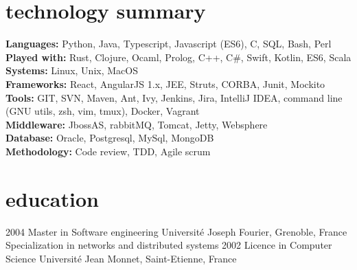 \documentclass[]{k-cv} %
\begin{document}

\section{technology summary}

\begin{freetext}
{
\textbf{Languages:} Python, Java, Typescript, Javascript (ES6), C, SQL, Bash, Perl\\
\textbf{Played with:} Rust, Clojure, Ocaml, Prolog, C++, C\#, Swift, Kotlin, ES6, Scala\\
\textbf{Systems:} Linux, Unix, MacOS\\
\textbf{Frameworks:} React, AngularJS 1.x, JEE, Struts, CORBA, Junit, Mockito\\
\textbf{Tools:} GIT, SVN, Maven, Ant, Ivy, Jenkins, Jira, IntelliJ IDEA, command line (GNU utils, zsh, vim, tmux), Docker, Vagrant\\
\textbf{Middleware:} JbossAS, rabbitMQ, Tomcat, Jetty, Websphere\\
\textbf{Database:} Oracle, Postgresql, MySql, MongoDB\\
\textbf{Methodology:} Code review, TDD, Agile scrum\\
}
\end{freetext}

\section{education}

\begin{entrylist}
\entry
{2004}
{Master {\normalfont in Software engineering}}
{Universit\'{e} Joseph Fourier, Grenoble, France}
{Specialization in networks and distributed systems}
\entry
{2002}
{Licence {\normalfont in Computer Science}}
{Universit\'{e} Jean Monnet, Saint-Etienne, France}
{}
\end{entrylist}


\end{document}
